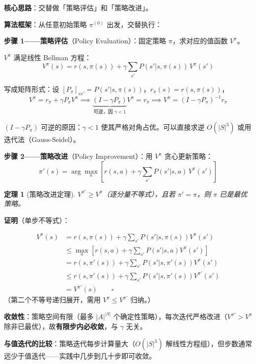 \documentclass[12pt, a4paper]{ctexart}
\newtheorem{theorem}{定理}[section]
\begin{document}
\begin{blackboard}

\textbf{核心思路}：交替做「策略评估」和「策略改进」。

\textbf{算法框架}：从任意初始策略 $\pi^{(0)}$ 出发，交替执行：

\textbf{步骤 1——策略评估}（Policy Evaluation）：固定策略 $\pi$，求对应的值函数 $V^\pi$。

$V^\pi$ 满足线性 Bellman 方程：
\[
V^\pi(s) = r(s, \pi(s)) + \gamma \sum_{s'} P(s' | s, \pi(s))\, V^\pi(s')
\]

写成矩阵形式：设 $[P_\pi]_{ss'} = P(s'|s,\pi(s))$，$r_\pi(s) = r(s,\pi(s))$，
\[
V^\pi = r_\pi + \gamma P_\pi V^\pi
\implies
\underbrace{(I - \gamma P_\pi)}_{\text{可逆，因 $\gamma < 1$}} V^\pi = r_\pi
\implies
V^\pi = (I - \gamma P_\pi)^{-1} r_\pi
\]

$(I - \gamma P_\pi)$ 可逆的原因：$\gamma < 1$ 使其严格对角占优。可以直接求逆 $O(|S|^3)$ 或用迭代法（Gauss-Seidel）。

\textbf{步骤 2——策略改进}（Policy Improvement）：用 $V^\pi$ 贪心更新策略：
\[
\pi'(s) = \arg\max_a \left[ r(s,a) + \gamma \sum_{s'} P(s'|s,a)\, V^\pi(s') \right]
\]

\begin{theorem}[策略改进定理]
$V^{\pi'} \geq V^\pi$（逐分量不等式），且若 $\pi' = \pi$，则 $\pi$ 已是最优策略。
\end{theorem}

\textbf{证明}（单步不等式）：

\begin{align*}
V^\pi(s) &= r(s,\pi(s)) + \gamma \sum_{s'} P(s'|s,\pi(s)) V^\pi(s') \\
&\leq \max_a \left[r(s,a) + \gamma \sum_{s'} P(s'|s,a) V^\pi(s')\right] \\
&= r(s,\pi'(s)) + \gamma \sum_{s'} P(s'|s,\pi'(s)) V^\pi(s') \\
&\leq r(s,\pi'(s)) + \gamma \sum_{s'} P(s'|s,\pi'(s)) V^{\pi'}(s') \\
&= V^{\pi'}(s) \qquad \square
\end{align*}
（第二个不等号递归展开，需用 $V^\pi \leq V^{\pi'}$ 归纳。）

\textbf{收敛性}：策略空间有限（最多 $|A|^{|S|}$ 个确定性策略），每次迭代严格改进（$V^{\pi'} > V^\pi$ 除非已最优），故\textbf{有限步内必收敛}，与 $\gamma$ 无关。

\textbf{与值迭代的比较}：策略迭代每步计算量大（$O(|S|^3)$ 解线性方程组），但步数通常远少于值迭代——实践中几步到几十步即可收敛。

\end{blackboard}
\end{document}
